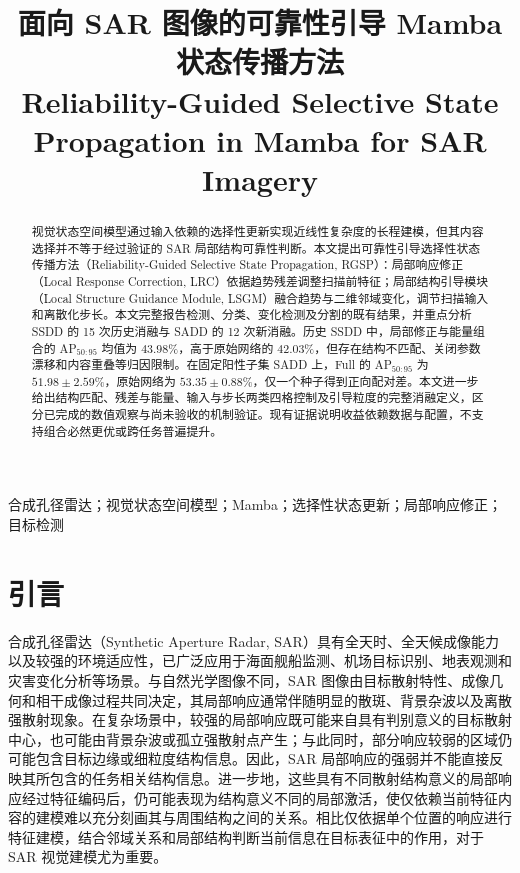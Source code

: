 \documentclass[journal]{IEEEtran}
\title{\LARGE 面向 SAR 图像的可靠性引导 Mamba 状态传播方法\\[0.5em]
{\large Reliability-Guided Selective State Propagation in Mamba for SAR Imagery}}
\author{}
\begin{document}
\raggedbottom
\maketitle
\begin{abstract}
视觉状态空间模型通过输入依赖的选择性更新实现近线性复杂度的长程建模，但其内容选择并不等于经过验证的 SAR 局部结构可靠性判断。本文提出可靠性引导选择性状态传播方法（Reliability-Guided Selective State Propagation, RGSP）：局部响应修正（Local Response Correction, LRC）依据趋势残差调整扫描前特征；局部结构引导模块（Local Structure Guidance Module, LSGM）融合趋势与二维邻域变化，调节扫描输入和离散化步长。本文完整报告检测、分类、变化检测及分割的既有结果，并重点分析 SSDD 的 15 次历史消融与 SADD 的 12 次新消融。历史 SSDD 中，局部修正与能量组合的 AP$_{50:95}$ 均值为 $43.98\%$，高于原始网络的 $42.03\%$，但存在结构不匹配、关闭参数漂移和内容重叠等归因限制。在固定阳性子集 SADD 上，Full 的 AP$_{50:95}$ 为 $51.98\pm2.59\%$，原始网络为 $53.35\pm0.88\%$，仅一个种子得到正向配对差。本文进一步给出结构匹配、残差与能量、输入与步长两类四格控制及引导粒度的完整消融定义，区分已完成的数值观察与尚未验收的机制验证。现有证据说明收益依赖数据与配置，不支持组合必然更优或跨任务普遍提升。
\end{abstract}
\begin{IEEEkeywords}合成孔径雷达；视觉状态空间模型；Mamba；选择性状态更新；局部响应修正；目标检测
\end{IEEEkeywords}

\section{引言}\label{sec:intro}

合成孔径雷达（Synthetic Aperture Radar, SAR）具有全天时、全天候成像能力以及较强的环境适应性，已广泛应用于海面舰船监测、机场目标识别、地表观测和灾害变化分析等场景。与自然光学图像不同，SAR 图像由目标散射特性、成像几何和相干成像过程共同决定，其局部响应通常伴随明显的散斑、背景杂波以及离散强散射现象。在复杂场景中，较强的局部响应既可能来自具有判别意义的目标散射中心，也可能由背景杂波或孤立强散射点产生；与此同时，部分响应较弱的区域仍可能包含目标边缘或细粒度结构信息。因此，SAR 局部响应的强弱并不能直接反映其所包含的任务相关结构信息。进一步地，这些具有不同散射结构意义的局部响应经过特征编码后，仍可能表现为结构意义不同的局部激活，使仅依赖当前特征内容的建模难以充分刻画其与周围结构之间的关系。相比仅依据单个位置的响应进行特征建模，结合邻域关系和局部结构判断当前信息在目标表征中的作用，对于 SAR 视觉建模尤为重要。
\end{document}
